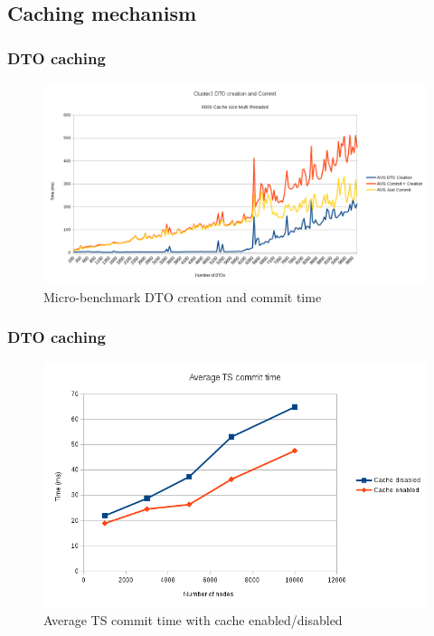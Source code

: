 \documentclass{beamer}
\begin{document}
\subsection{Caching mechanism}
\begin{frame}
\frametitle{DTO caching}

\begin{figure}
\centering
\includegraphics[scale=0.3]{resources/cache_create_commit.png}
\caption{Micro-benchmark DTO creation and commit time}
\end{figure}
\end{frame}

\begin{frame}
\frametitle{DTO caching}

\begin{figure}
\centering
\includegraphics[scale=0.4]{resources/avg_commit_cache_en_di.png}
\caption{Average TS commit time with cache enabled/disabled}
\end{figure}
\end{frame}
\end{document}
